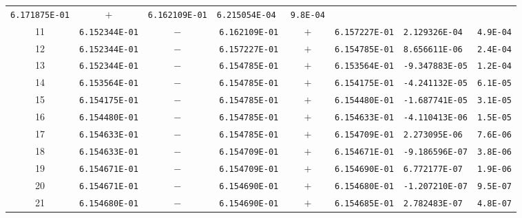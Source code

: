 \begin{longtable}[t]{c|c|c|c|c|c|c|c}
    \texttt{6.171875E-01} & \(+\)                  &
    \texttt{6.162109E-01} & \texttt{6.215054E-04 } & \texttt{9.8E-04} \\
    11                    &
    \texttt{6.152344E-01} & \(-\)                  &
    \texttt{6.162109E-01} & \(+\)                  &
    \texttt{6.157227E-01} & \texttt{2.129326E-04 } & \texttt{4.9E-04} \\
    12                    &
    \texttt{6.152344E-01} & \(-\)                  &
    \texttt{6.157227E-01} & \(+\)                  &
    \texttt{6.154785E-01} & \texttt{8.656611E-06 } & \texttt{2.4E-04} \\
    13                    &
    \texttt{6.152344E-01} & \(-\)                  &
    \texttt{6.154785E-01} & \(+\)                  &
    \texttt{6.153564E-01} & \texttt{-9.347883E-05} & \texttt{1.2E-04} \\
    14                    &
    \texttt{6.153564E-01} & \(-\)                  &
    \texttt{6.154785E-01} & \(+\)                  &
    \texttt{6.154175E-01} & \texttt{-4.241132E-05} & \texttt{6.1E-05} \\
    15                    &
    \texttt{6.154175E-01} & \(-\)                  &
    \texttt{6.154785E-01} & \(+\)                  &
    \texttt{6.154480E-01} & \texttt{-1.687741E-05} & \texttt{3.1E-05} \\
    16                    &
    \texttt{6.154480E-01} & \(-\)                  &
    \texttt{6.154785E-01} & \(+\)                  &
    \texttt{6.154633E-01} & \texttt{-4.110413E-06} & \texttt{1.5E-05} \\
    17                    &
    \texttt{6.154633E-01} & \(-\)                  &
    \texttt{6.154785E-01} & \(+\)                  &
    \texttt{6.154709E-01} & \texttt{2.273095E-06 } & \texttt{7.6E-06} \\
    18                    &
    \texttt{6.154633E-01} & \(-\)                  &
    \texttt{6.154709E-01} & \(+\)                  &
    \texttt{6.154671E-01} & \texttt{-9.186596E-07} & \texttt{3.8E-06} \\
    19                    &
    \texttt{6.154671E-01} & \(-\)                  &
    \texttt{6.154709E-01} & \(+\)                  &
    \texttt{6.154690E-01} & \texttt{6.772177E-07 } & \texttt{1.9E-06} \\
    20                    &
    \texttt{6.154671E-01} & \(-\)                  &
    \texttt{6.154690E-01} & \(+\)                  &
    \texttt{6.154680E-01} & \texttt{-1.207210E-07} & \texttt{9.5E-07} \\
    21                    &
    \texttt{6.154680E-01} & \(-\)                  &
    \texttt{6.154690E-01} & \(+\)                  &
    \texttt{6.154685E-01} & \texttt{2.782483E-07 } & \texttt{4.8E-07}
\end{longtable}